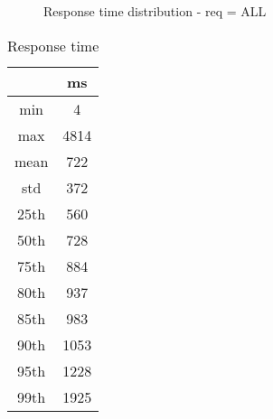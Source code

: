 \begin{minipage}{0.75\linewidth}
\begin{figure}[h]
\begin{adjustbox}{max width=1.0\linewidth, keepaspectratio}
  \end{adjustbox}
  \caption{Response time distribution - req = ALL}
\end{figure}
\end{minipage}\hfill\begin{minipage}{0.18\linewidth}
\begin{table}[h]
\begin{tabular}{|cc|}
\hline
\textbf{} & \textbf{ms}\\ \hline
 \Xhline{0.005\arrayrulewidth}
min & 4\\
 \Xhline{0.005\arrayrulewidth}
max & 4814\\
 \Xhline{0.005\arrayrulewidth}
mean & 722\\
 \Xhline{0.005\arrayrulewidth}
std & 372\\
\hline
\hline
 \Xhline{0.005\arrayrulewidth}
25th & 560\\
 \Xhline{0.005\arrayrulewidth}
50th & 728\\
 \Xhline{0.005\arrayrulewidth}
75th & 884\\
 \Xhline{0.005\arrayrulewidth}
80th & 937\\
 \Xhline{0.005\arrayrulewidth}
85th & 983\\
 \Xhline{0.005\arrayrulewidth}
90th & 1053\\
 \Xhline{0.005\arrayrulewidth}
95th & 1228\\
 \Xhline{0.005\arrayrulewidth}
99th & 1925\\
\hline
\end{tabular}
\caption{Response time}
\end{table}
\end{minipage}\hfill